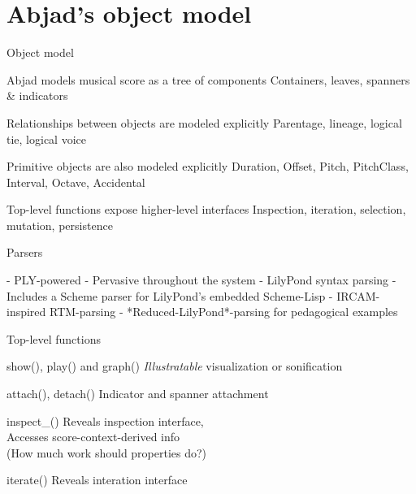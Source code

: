 \section{Abjad's object model}

\begin{frame}{Object model}
    \begin{block}
        {Abjad models musical score as a tree of components}
        Containers, leaves, spanners \& indicators
    \end{block}
    \begin{block}
        {Relationships between objects are modeled explicitly}
        Parentage, lineage, logical tie, logical voice
    \end{block}
    \begin{block}
        {Primitive objects are also modeled explicitly}
        Duration, Offset, Pitch, PitchClass, Interval, Octave, Accidental
    \end{block}
    \begin{block}
        {Top-level functions expose higher-level interfaces}
        Inspection, iteration, selection, mutation, persistence
    \end{block}
\end{frame}

\begin{frame}[fragile]{Parsers}
\begin{markdown}
- PLY-powered
- Pervasive throughout the system
- LilyPond syntax parsing
    - Includes a Scheme parser for LilyPond's embedded Scheme-Lisp
- IRCAM-inspired RTM-parsing
- *Reduced-LilyPond*-parsing for pedagogical examples
\end{markdown}
\end{frame}

\begin{frame}[fragile]{Top-level functions}
    \begin{block}{show(), play() and graph()}
        \emph{Illustratable} visualization or sonification
    \end{block}
    \begin{block}{attach(), detach()}
        Indicator and spanner attachment
    \end{block}
    \begin{block}{inspect\_()}
        Reveals inspection interface,\\
        Accesses score-context-derived info\\
        (How much work should properties do?)
    \end{block}
    \begin{block}{iterate()}
        Reveals interation interface
    \end{block}
\end{frame}

